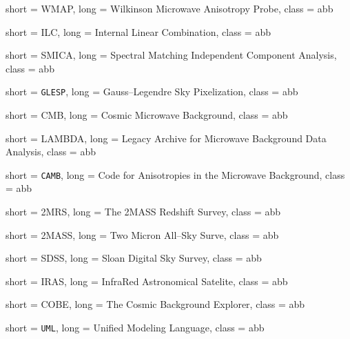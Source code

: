 

 {
    short = WMAP,
    long = Wilkinson Microwave Anisotropy Probe,
    class = abb
}
\providecommand{\wmap}{\ac{wmap}\xspace}

 {
    short = ILC,
    long = Internal Linear Combination,
    class = abb
}
\providecommand{\ilc}{\ac{ilc}\xspace}

 {
    short = SMICA,
    long = Spectral Matching Independent Component Analysis,
    class = abb
}
\providecommand{\smica}{\ac{smica}\xspace}

 {
    short = \texttt{GLESP},
    long = Gauss--Legendre Sky Pixelization,
    class = abb
}
\providecommand{\glesp}{\ac{glesp}\xspace}

 {
    short = CMB,
    long = Cosmic Microwave Background,
    class = abb
}
\providecommand{\cmb}{\ac{cmb}\xspace}

 {
    short = LAMBDA,
    long = Legacy Archive for Microwave Background Data Analysis,
    class = abb
}
\providecommand{\LAMBDA}{\ac{lambda}\xspace}

 {
    short = \texttt{CAMB},
    long = Code for Anisotropies in the Microwave Background,
    class = abb
}
\providecommand{\camb}{\ac{camb}\xspace}

 {
    short = 2MRS,
    long = The 2MASS Redshift Survey,
    class = abb
}
\providecommand{\mrs}{\ac{mrs}\xspace}

 {
    short = 2MASS,
    long = Two Micron All--Sky Surve,
    class = abb
}
\providecommand{\mass}{\ac{mass}\xspace}

 {
    short = SDSS,
    long = Sloan Digital Sky Survey,
    class = abb
}
\providecommand{\sdss}{\ac{sdss}\xspace}

 {
    short = IRAS,
    long = InfraRed Astronomical Satelite,
    class = abb
}
\providecommand{\iras}{\ac{iras}\xspace}

 {
    short = COBE,
    long = The Cosmic Background Explorer,
    class = abb
}
\providecommand{\cobe}{\ac{cobe}\xspace}

 {
    short = \texttt{UML},
    long = Unified Modeling Language,
    class = abb
}
\providecommand{\uml}{\acs{uml}\xspace}

